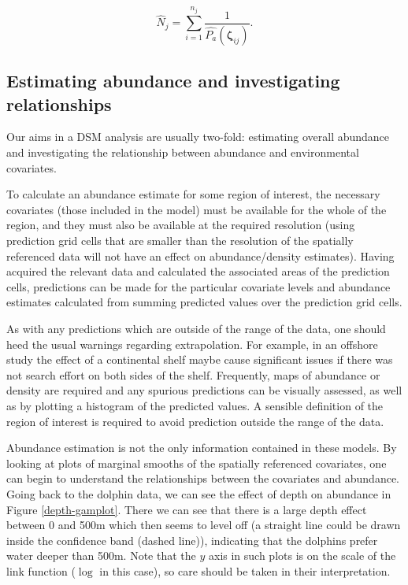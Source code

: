 \documentclass[a4paper,12pt]{article}
\begin{document}
\begin{equation*}
\hat{N}_j = \sum_{i=1}^{n_j} \frac{1}{\hat{P_a}(\bm{\zeta}_{ij})}.
\end{equation*}

\subsection*{Estimating abundance and investigating relationships}

Our aims in a DSM analysis are usually two-fold: estimating overall abundance and investigating the relationship between abundance and environmental covariates.

To calculate an abundance estimate for some region of interest, the necessary covariates (those included in the model) must be available for the whole of the region, and they must also be available at the required resolution (using prediction grid cells that are smaller than the resolution of the spatially referenced data will not have an effect on abundance/density estimates). Having acquired the relevant data and calculated the associated areas of the prediction cells, predictions can be made for the particular covariate levels and abundance estimates calculated from summing predicted values over the prediction grid cells. 

As with any predictions which are outside of the range of the data, one should heed the usual warnings regarding extrapolation. For example, in an offshore study the effect of a continental shelf maybe cause significant issues if there was not search effort on both sides of the shelf. Frequently,  maps of abundance or density are required and any spurious predictions can be visually assessed, as well as by plotting a histogram of the predicted values. A sensible definition of the region of interest is required to avoid prediction outside the range of the data.

Abundance estimation is not the only information contained in these models. By looking at plots of marginal smooths of the spatially referenced covariates, one can begin to understand the relationships between the covariates and abundance. Going back to the dolphin data, we can see the effect of depth on abundance in Figure \ref{depth-gamplot}. There we can see that there is a large depth effect between 0 and 500m which then seems to level off (a straight line could be drawn inside the confidence band (dashed line)), indicating that the dolphins prefer water deeper than 500m. Note that the $y$ axis in such plots is on the scale of the link function ($\log$ in this case), so care should be taken in their interpretation.
\end{document}
